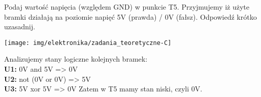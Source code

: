 % 
% 
% 
% 




%
%

\dbEntryCheckResults
Podaj wartość napięcia (względem GND) w punkcie T5. Przyjmujemy iż użyte bramki działają na poziomie napięć 5V (prawda) / 0V (fałsz). Odpowiedź krótko uzasadnij.
	\begin{center}
		\texttt{[image: img/elektronika/zadania\_teoretyczne-C]}
	\end{center}
\fi
{}\dbEntryCheckResults
Analizujemy stany logiczne kolejnych bramek:\\
	\textbf{U1:} 0V and 5V => 0V\\
	\textbf{U2:} not (0V or 0V) => 5V\\
	\textbf{U3:} 5V xor 5V => 0V
Zatem w T5 mamy stan niski, czyli 0V.
\fi

